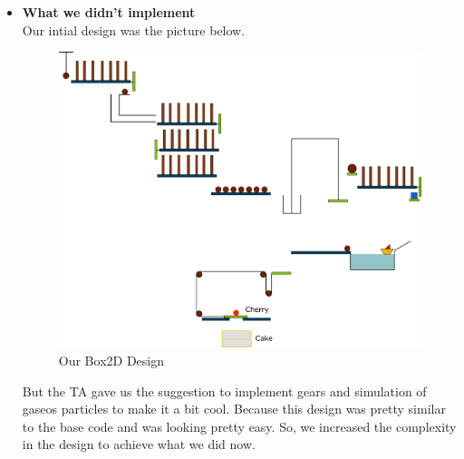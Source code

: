 \documentclass{article}
\begin{document}
\begin{itemize}
    \item[] \textbf{\Large What we didn't implement} \\ 
Our intial design was the picture below.
\begin{figure}[h]
\centering
\includegraphics[width=1 \linewidth]{box2D.png}
\caption{\large Our Box2D Design}
\end{figure}
But the TA gave us the suggestion to implement gears and simulation of gaseos particles to make it a bit cool. Because this design was pretty similar to the base code and was looking pretty easy. So, we increased the complexity in the design to achieve what we did now.
\\ \vspace{0.4 cm}

\end{itemize}



\end{document}
